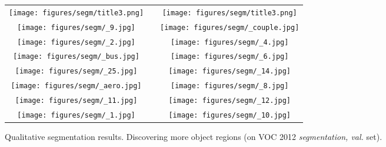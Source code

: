 \documentclass[10pt,twocolumn,letterpaper]{article}
\begin{document}
\begin{figure*}
\begin{center}
\def\arraystretch{0.5}
\begin{tabular}{@{}c@{\hskip 0.01\linewidth}c@{\hskip 0.01\linewidth}c}
\texttt{[image: figures/segm/title3.png]} &&
\texttt{[image: figures/segm/title3.png]} \\
\texttt{[image: figures/segm/\_9.jpg]} &&
\texttt{[image: figures/segm/\_couple.jpg]} \\
\texttt{[image: figures/segm/\_2.jpg]} &&
\texttt{[image: figures/segm/\_4.jpg]} \\
\texttt{[image: figures/segm/\_bus.jpg]} &&
\texttt{[image: figures/segm/\_6.jpg]} \\
\texttt{[image: figures/segm/\_25.jpg]} &&
\texttt{[image: figures/segm/\_14.jpg]} \\
\texttt{[image: figures/segm/\_aero.jpg]} &&
\texttt{[image: figures/segm/\_8.jpg]} \\
\texttt{[image: figures/segm/\_11.jpg]} &&
\texttt{[image: figures/segm/\_12.jpg]} \\
\texttt{[image: figures/segm/\_1.jpg]} &&
\texttt{[image: figures/segm/\_10.jpg]} \\
\end{tabular}
\end{center}
\vspace{-0.2in}
\caption{Qualitative segmentation results. Discovering more object regions (on VOC 2012 \textit{segmentation, val.} set).}
\label{fig:segm1}
\end{figure*}
\end{document}
